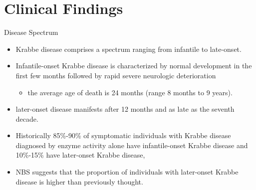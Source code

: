 \documentclass[presentation, smaller]{beamer}
\begin{document}
\section{Clinical Findings}
\label{sec:orgdc79a66}
\begin{frame}[label={sec:orgeedf985}]{Disease Spectrum}
\begin{itemize}
\item Krabbe disease comprises a spectrum ranging from infantile to late-onset.

\item Infantile-onset Krabbe disease is characterized by normal
development in the first few months followed by rapid severe
neurologic deterioration
\begin{itemize}
\item the average age of death is 24 months (range 8 months to 9 years).
\end{itemize}

\item later-onset disease manifests after 12 months and as late as the
seventh decade.

\item Historically 85\%-90\% of symptomatic individuals with Krabbe disease
diagnosed by enzyme activity alone have infantile-onset Krabbe
disease and 10\%-15\% have later-onset Krabbe disease,

\item NBS suggests that the proportion of individuals with later-onset
Krabbe disease is higher than previously thought.
\end{itemize}
\end{frame}
\end{document}
